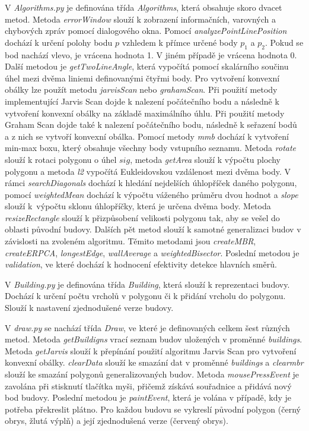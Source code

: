 \documentclass{article}
\begin{document}
\begin{spacing}{1.5}
V \textit{Algorithms.py} je definována třída \textit{Algorithms}, která obsahuje skoro dvacet metod. Metoda \textit{errorWindow} slouží k zobrazení informačních, varovných a chybových zpráv pomocí dialogového okna. Pomocí \textit{analyzePointLinePosition} dochází k určení polohy bodu $p$ vzhledem k přímce určené body $p_1$ a $p_2$. Pokud se bod nachází vlevo, je vrácena hodnota 1. V jiném případě je vrácena hodnota 0. Další metodou je \textit{getTwoLineAngle}, která vypočítá pomocí skalárního součinu úhel mezi dvěma liniemi definovanými čtyřmi body. Pro vytvoření konvexní obálky lze použít metodu \textit{jarvisScan} nebo \textit{grahamScan}. Při použití metody implementující Jarvis Scan dojde k nalezení počátečního bodu a následně k vytvoření konvexní obálky na základě maximálního úhlu. Při použití metody Graham Scan dojde také k nalezení počátečního bodu, následně k seřazení bodů a z nich se vytvoří konvexní obálka.  Pomocí metody \textit{mmb} dochází k vytvoření min-max boxu, který obsahuje všechny body vstupního seznamu. Metoda \textit{rotate} slouží k rotaci polygonu o úhel $sig$, metoda \textit{getArea} slouží k výpočtu plochy polygonu a metoda \textit{l2} vypočítá Eukleidovskou vzdálenost mezi dvěma body. V rámci \textit{searchDiagonals} dochází k hledání nejdelších úhlopříček daného polygonu, pomocí \textit{weightedMean} dochází k výpočtu váženého průměru dvou hodnot a \textit{slope} slouží k~výpočtu sklonu úhlopříčky, která je určena dvěma body. Metoda \textit{resizeRectangle} slouží k přizpůsobení velikosti polygonu tak, aby se vešel do oblasti původní budovy. Dalších pět metod slouží k samotné generalizaci budov v závislosti na zvoleném algoritmu. Těmito metodami jsou \textit{createMBR}, \textit{createERPCA}, \textit{longestEdge}, \textit{wallAverage} a \textit{weightedBisector}. Poslední metodou je \textit{validation}, ve které dochází k hodnocení efektivity detekce hlavních směrů. 

V \textit{Building.py} je definována třída \textit{Building}, která slouží k reprezentaci budovy. Dochází k určení počtu vrcholů v polygonu či k přidání vrcholu do polygonu. Slouží k nastavení zjednodušené verze budovy. 

V \textit{draw.py} se nachází třída \textit{Draw}, ve které je definovaných celkem šest různých metod. Metoda \textit{getBuildigns} vrací seznam budov uložených v proměnné \textit{buildings}. Metoda \textit{getJarvis} slouží k přepínání použití algoritmu Jarvis Scan pro vytvoření konvexní obálky. \textit{clearData} slouží ke smazání dat v proměnné \textit{buildings} a \textit{clearmbr} slouží ke smazání polygonů generalizovaných budov. Metoda \textit{mousePressEvent} je zavolána při stisknutí tlačítka myši, přičemž získává souřadnice a přidává nový bod budovy. Poslední metodou je \textit{paintEvent}, která je volána v případě, kdy je potřeba překreslit plátno. Pro každou budovu se vykreslí původní polygon (černý obrys, žlutá výplň) a její zjednodušená verze (červený obrys). 


\end{spacing}
\end{document}
